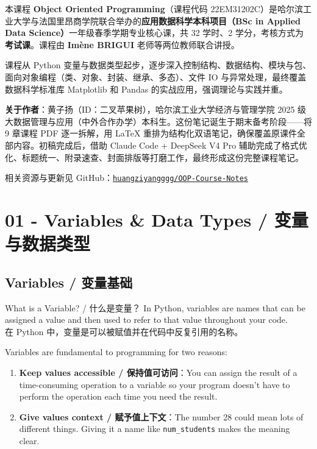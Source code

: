 \documentclass[11pt,a4paper]{report}
\let\oldtexttt\texttt
\renewcommand{\texttt}[1]{\textcolor{mainblue}{\oldtexttt{#1}}}
\begin{document}
本课程 \textbf{Object Oriented Programming}（课程代码 22EM31202C）是哈尔滨工业大学与法国里昂商学院联合举办的\textbf{应用数据科学本科项目（BSc in Applied Data Science）}一年级春季学期专业核心课，共 32 学时、2 学分，考核方式为\textbf{考试课}。课程由 \textbf{Imène BRIGUI} 老师等两位教师联合讲授。

课程从 Python 变量与数据类型起步，逐步深入控制结构、数据结构、模块与包、面向对象编程（类、对象、封装、继承、多态）、文件 IO 与异常处理，最终覆盖数据科学标准库 Matplotlib 和 Pandas 的实战应用，强调理论与实践并重。

\vspace{1em}

\noindent \textbf{关于作者}：黄子扬（ID：二叉苹果树），哈尔滨工业大学经济与管理学院 2025 级大数据管理与应用（中外合作办学）本科生。这份笔记诞生于期末备考阶段——将 9 章课程 PDF 逐一拆解，用 \LaTeX{} 重排为结构化双语笔记，确保覆盖原课件全部内容。初稿完成后，借助 Claude Code + DeepSeek V4 Pro 辅助完成了格式优化、标题统一、附录速查、封面排版等打磨工作，最终形成这份完整课程笔记。

相关资源与更新见 GitHub：\href{https://github.com/huangziyangggg/OOP-Course-Notes}{\texttt{huangziyangggg/OOP-Course-Notes}}

\newpage

\tableofcontents
\newpage

\chapter{01 - Variables \& Data Types / 变量与数据类型}



\section{Variables / 变量基础}

\begin{concept}{What is a Variable? / 什么是变量？}
    In Python, variables are names that can be assigned a value and then used to refer to that value throughout your code. \\
    在 Python 中，变量是可以被赋值并在代码中反复引用的名称。

    Variables are fundamental to programming for two reasons:
    \begin{enumerate}[itemsep=0.3em]
        \item \textbf{Keep values accessible / 保持值可访问}：You can assign the result of a time-consuming operation to a variable so your program doesn't have to perform the operation each time you need the result.
        \item \textbf{Give values context / 赋予值上下文}：The number 28 could mean lots of different things. Giving it a name like \texttt{num\_students} makes the meaning clear.
    \end{enumerate}
\end{concept}
\end{document}
